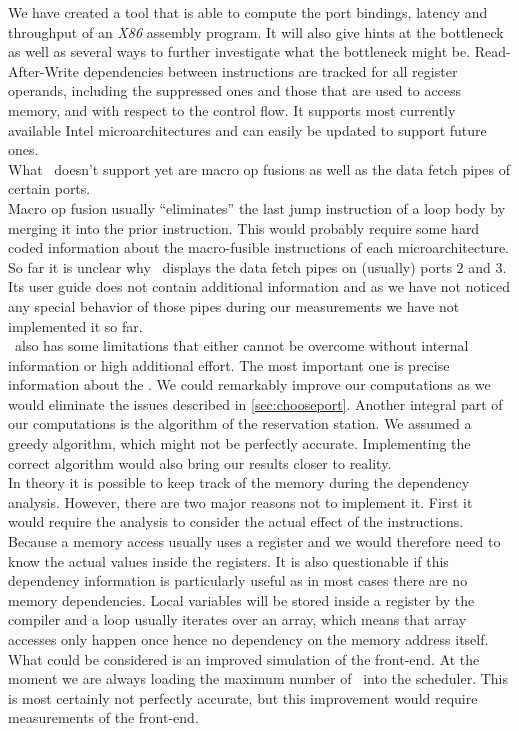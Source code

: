 
We have created a tool that is able to compute the port bindings, latency and throughput of an \emph{X86} assembly program. It will also give hints at the bottleneck as well as several ways to further investigate what the bottleneck might be. Read-After-Write dependencies between instructions are tracked for all register operands, including the suppressed ones and those that are used to access memory, and with respect to the control flow. It supports most currently available Intel microarchitectures and can easily be updated to support future ones.\\

What \suaca\ doesn't support yet are macro op fusions as well as the data fetch pipes of certain ports.\\
Macro op fusion usually ``eliminates'' the last jump instruction of a loop body by merging it into the prior instruction. This would probably require some hard coded information about the macro-fusible instructions of each microarchitecture.\\
So far it is unclear why \iaca\ displays the data fetch pipes on (usually) ports $2$ and $3$. Its user guide does not contain additional information and as we have not noticed any special behavior of those pipes during our measurements we have not implemented it so far.\\

\suaca\ also has some limitations that either cannot be overcome without internal information or high additional effort.
The most important one is precise information about the \microops. We could remarkably improve our computations as we would eliminate the issues described in \autoref{sec:chooseport}. Another integral part of our computations is the algorithm of the reservation station. We assumed a greedy algorithm, which might not be perfectly accurate. Implementing the correct algorithm would also bring our results closer to reality.\\
In theory it is possible to keep track of the memory during the dependency analysis. However, there are two major reasons not to implement it. First it would require the analysis to consider the actual effect of the instructions. Because a memory access usually uses a register and we would therefore need to know the actual values inside the registers. It is also questionable if this dependency information is particularly useful as in most cases there are no memory dependencies. Local variables will be stored inside a register by the compiler and a loop usually iterates over an array, which means that array accesses only happen once hence no dependency on the memory address itself.\\
What could be considered is an improved simulation of the front-end. At the moment we are always loading the maximum number of \microops\ into the scheduler. This is most certainly not perfectly accurate, but this improvement would require measurements of the front-end.